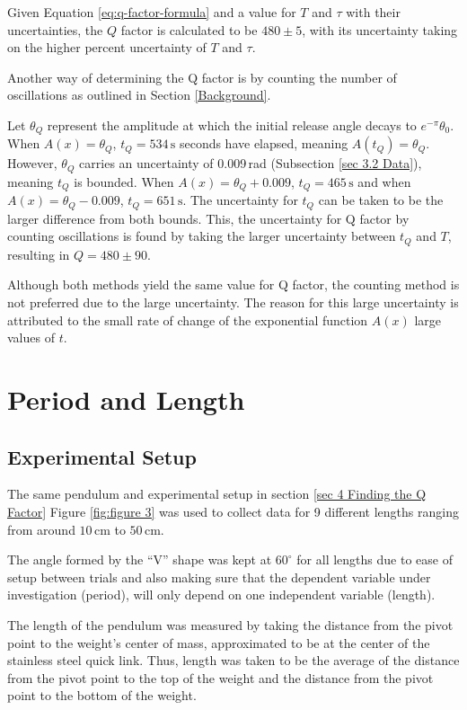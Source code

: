 \documentclass[11pt]{article}
\begin{document}
\begin{multicols}{2}
Given Equation \ref{eq:q-factor-formula} and a  value for $T$ and $\tau$ with their uncertainties, the $Q$ factor is calculated to be $480 \pm 5$, with its uncertainty taking on the higher percent uncertainty of $T$ and $\tau$.

Another way of determining the Q factor is by counting the number of oscillations as outlined in Section \ref{Background}.

Let $\theta_Q$ represent the amplitude at which the initial release angle decays to $e^{-\pi}\theta_0$. When $A(x) = \theta_Q$, $t_Q = 534\,\text{s}$ seconds have elapsed, meaning $A(t_Q) = \theta_Q$. However, $\theta_Q$ carries an uncertainty of 0.009\,rad (Subsection \ref{sec 3.2 Data}), meaning $t_Q$ is bounded. When $A(x) = \theta_Q + 0.009$, $t_Q = 465\,\text{s}$ and when $A(x) = \theta_Q - 0.009$, $t_Q = 651\,\text{s}$. The uncertainty for $t_Q$ can be taken to be the larger difference from both bounds. This, the uncertainty for Q factor by counting oscillations is found by taking the larger uncertainty between $t_Q$ and $T$, resulting in $Q = 480 \pm 90$.

Although both methods yield the same value for Q factor, the counting method is not preferred due to the large uncertainty. The reason for this large uncertainty is attributed to the small rate of change of the exponential function $A(x)$ large values of $t$.


\section{Period and Length} \label{sec 5 period and length}

\subsection{Experimental Setup}
The same pendulum and experimental setup in section \ref{sec 4 Finding the Q Factor} Figure \ref{fig:figure 3} was used to collect data for 9 different lengths ranging from around $10\,$cm to $50\,$cm.

The angle formed by the ``V'' shape was kept at $60^\circ$ for all lengths due to ease of setup between trials and also making sure that the dependent variable under investigation (period), will only depend on one independent variable (length).

The length of the pendulum was measured by taking the distance from the pivot point to the weight's center of mass, approximated to be at the center of the stainless steel quick link. Thus, length was taken to be the average of the distance from the pivot point to the top of the weight and the distance from the pivot point to the bottom of the weight.


\end{multicols}
\end{document}
